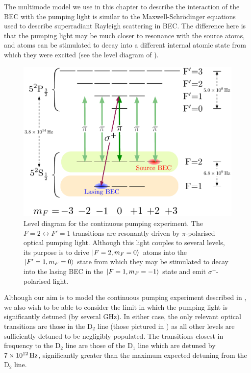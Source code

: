 The multimode model we use in this chapter to describe the interaction of the BEC with the pumping light is similar to the Maxwell-Schrödinger equations \citep{Zobay:2005,Zobay:2006} used to describe superradiant Rayleigh scattering in BEC.  The difference here is that the pumping light may be much closer to resonance with the source atoms, and atoms can be stimulated to decay into a different internal atomic state from which they were excited (see the level diagram of ).

\begin{figure}
    \centering
    \includegraphics[width=13cm]{LevelDiagram}
    \caption{Level diagram for the continuous pumping experiment.  The $F=2 \leftrightarrow F'=1$ transitions are resonantly driven by $\pi$-polarised optical pumping light.  Although this light couples to several levels, its purpose is to drive ${\left|F=2, m_F=0\right>}$ atoms into the ${\left|F'=1, m_F=0\right>}$ state from which they may be stimulated to decay into the lasing BEC in the ${\left|F=1, m_F=-1\right>}$ state and emit $\sigma^+$-polarised light.}
    \label{OpticalPumping:LevelDiagram}
\end{figure}

Although our aim is to model the continuous pumping experiment described in , we also wish to be able to consider the limit in which the pumping light is significantly detuned (by several GHz).  In either case, the only relevant optical transitions are those in the $\text{D}_2$ line (those pictured in ) as all other levels are sufficiently detuned to be negligibly populated.  The transitions closest in frequency to the $\text{D}_2$ line are those of the $\text{D}_1$ line which are detuned by $7 \times \unit[10^{12}]{Hz}$, significantly greater than the maximum expected detuning from the $\text{D}_2$ line.


